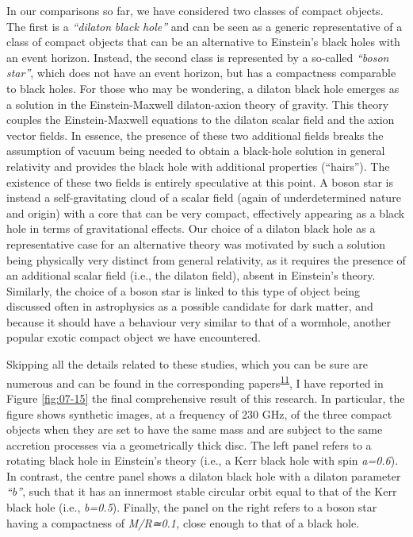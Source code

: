 In our comparisons so far, we have considered two classes of compact objects. The first
is a \emph{``dilaton} \emph{black hole''} and can be seen as a
generic representative of a class of compact objects that can be an alternative to
Einstein's black holes with an event horizon. Instead, the second class is represented
by a so-called \emph{``boson star}\emph{''}, which
does not have an event horizon, but has a
compactness comparable to black holes. For those who may be
wondering, a dilaton black hole emerges as a solution in the Einstein-Maxwell
dilaton-axion theory of gravity. This theory couples the
Einstein-Maxwell equations to the dilaton scalar field and the axion
vector fields. In essence, the presence of these two additional
fields breaks the assumption of vacuum being needed to obtain a
black-hole solution in general relativity and provides the black hole with additional
properties (``hairs''). The existence of these two fields is entirely
speculative at this point. A boson star is instead a self-gravitating cloud of a scalar
field (again of underdetermined nature and origin) with a core that can be very compact,
effectively appearing as a black hole in terms of gravitational effects. Our choice of a
dilaton black hole as a representative case for an alternative theory was motivated by
such a solution being physically very distinct from general relativity, as it requires
the presence of an additional scalar field (i.e., the dilaton field), absent in
Einstein's theory. Similarly, the choice of a boson star is linked to this type of
object being discussed often in astrophysics as a possible candidate for dark
matter, and because it should have a behaviour very similar to that
of a wormhole, another popular exotic compact object we have
encountered.

Skipping all the details related to these studies, which you can be sure are numerous
and can be found in the corresponding papers\textsuperscript{\hyperlink{note:07-11}{11}}, I have reported in
Figure \ref{fig:07-15} the final comprehensive result of this research. In particular, the figure
shows synthetic images, at a frequency of 230 GHz, of the three
compact objects when they are set to have the same mass and are subject to the same
accretion processes via a geometrically thick disc. The left panel refers to a rotating
black hole in Einstein's theory (i.e., a Kerr black hole with spin
\emph{a=0.6}). In contrast, the centre panel shows a dilaton black
hole with a dilaton parameter \emph{``b''}, such that it has an innermost stable
circular orbit equal to that of the Kerr black
hole (i.e., \emph{b=0.5}). Finally, the panel on the right refers to
a boson star having a compactness of
\emph{M/R≃0.1,} close enough to that of a black hole.

